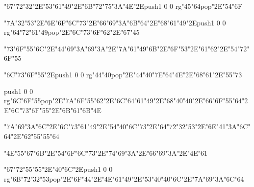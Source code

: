 \vfill\eject
\null\vfill
\centerline{\ipa\char"67\ipa\char"72\ipa\char"32\ipa\char"2E\ipa\char"53\ipa\char"61\ipa\char"49\ipa\char"2E\ipa\char"6B\ipa\char"72\ipa\char"75\ipa\char"3A\ipa\char"4E\ipa\char"2E\pdfcolorstack\match push{1 0 0 rg}\ipa\char"45\ipa\char"64\pdfcolorstack\match pop{}\ipa\char"2E\ipa\char"54\ipa\char"6F}\bigskip
\centerline{\ipa\char"7A\ipa\char"32\ipa\char"53\ipa\char"2E\ipa\char"6E\ipa\char"6F\ipa\char"6C\ipa\char"73\ipa\char"2E\ipa\char"66\ipa\char"69\ipa\char"3A\ipa\char"6B\ipa\char"64\ipa\char"2E\ipa\char"68\ipa\char"61\ipa\char"49\ipa\char"2E\pdfcolorstack\match push{1 0 0 rg}\ipa\char"64\ipa\char"72\ipa\char"61\ipa\char"49\pdfcolorstack\match pop{}\ipa\char"2E\ipa\char"6C\ipa\char"73\ipa\char"6F\ipa\char"62\ipa\char"2E\ipa\char"67\ipa\char"45}\bigskip
\centerline{\ipa\char"73\ipa\char"6F\ipa\char"55\ipa\char"6C\ipa\char"2E\ipa\char"44\ipa\char"69\ipa\char"3A\ipa\char"69\ipa\char"3A\ipa\char"2E\ipa\char"7A\ipa\char"61\ipa\char"49\ipa\char"6B\ipa\char"2E\ipa\char"6F\ipa\char"53\ipa\char"2E\ipa\char"61\ipa\char"62\ipa\char"2E\ipa\char"54\ipa\char"72\ipa\char"6F\ipa\char"55}
\vfill\eject
\null\vfill
\centerline{\ipa\char"6C\ipa\char"73\ipa\char"6F\ipa\char"55\ipa\char"2E\pdfcolorstack\match push{1 0 0 rg}\ipa\char"44\ipa\char"40\pdfcolorstack\match pop{}\ipa\char"2E\ipa\char"44\ipa\char"40\ipa\char"7E\ipa\char"64\ipa\char"4E\ipa\char"2E\ipa\char"68\ipa\char"61\ipa\char"2E\ipa\char"55\ipa\char"73}\bigskip
\centerline{\pdfcolorstack\match push{1 0 0 rg}\ipa\char"6C\ipa\char"6F\ipa\char"55\pdfcolorstack\match pop{}\ipa\char"2E\ipa\char"7A\ipa\char"6F\ipa\char"55\ipa\char"62\ipa\char"2E\ipa\char"6C\ipa\char"64\ipa\char"61\ipa\char"49\ipa\char"2E\ipa\char"68\ipa\char"40\ipa\char"40\ipa\char"2E\ipa\char"66\ipa\char"6F\ipa\char"55\ipa\char"64\ipa\char"2E\ipa\char"6C\ipa\char"73\ipa\char"6F\ipa\char"55\ipa\char"2E\ipa\char"6B\ipa\char"61\ipa\char"6B\ipa\char"4E}\bigskip
\centerline{\ipa\char"7A\ipa\char"69\ipa\char"3A\ipa\char"6C\ipa\char"2E\ipa\char"6C\ipa\char"73\ipa\char"61\ipa\char"49\ipa\char"2E\ipa\char"54\ipa\char"40\ipa\char"6C\ipa\char"73\ipa\char"2E\ipa\char"64\ipa\char"72\ipa\char"32\ipa\char"53\ipa\char"2E\ipa\char"6E\ipa\char"41\ipa\char"3A\ipa\char"6C\ipa\char"64\ipa\char"2E\ipa\char"62\ipa\char"55\ipa\char"55\ipa\char"64}
\vfill\eject
\null\vfill
\centerline{\ipa\char"4E\ipa\char"55\ipa\char"67\ipa\char"6B\ipa\char"2E\ipa\char"54\ipa\char"6F\ipa\char"6C\ipa\char"73\ipa\char"2E\ipa\char"74\ipa\char"69\ipa\char"3A\ipa\char"2E\ipa\char"66\ipa\char"69\ipa\char"3A\ipa\char"2E\ipa\char"4E\ipa\char"61}\bigskip
\centerline{\ipa\char"67\ipa\char"72\ipa\char"55\ipa\char"55\ipa\char"2E\ipa\char"40\ipa\char"6C\ipa\char"2E\pdfcolorstack\match push{1 0 0 rg}\ipa\char"6B\ipa\char"72\ipa\char"32\ipa\char"53\pdfcolorstack\match pop{}\ipa\char"2E\ipa\char"6F\ipa\char"44\ipa\char"2E\ipa\char"4E\ipa\char"61\ipa\char"49\ipa\char"2E\ipa\char"53\ipa\char"40\ipa\char"40\ipa\char"6C\ipa\char"2E\ipa\char"7A\ipa\char"69\ipa\char"3A\ipa\char"6C\ipa\char"64}\bigskip
